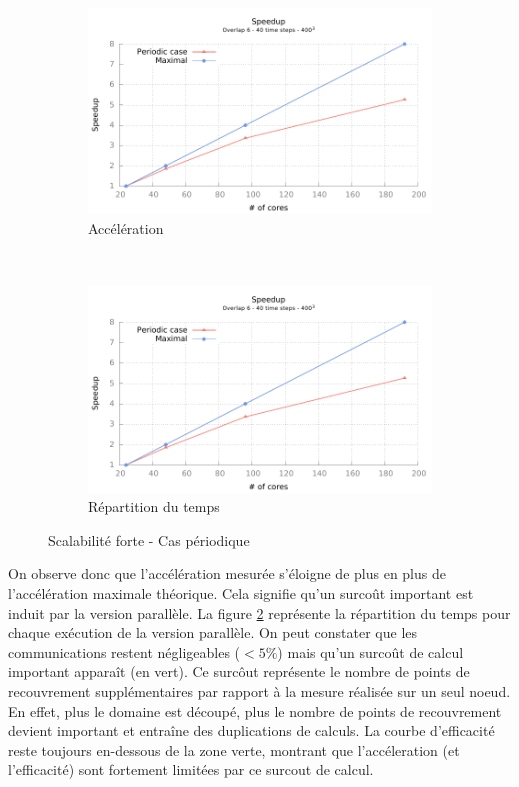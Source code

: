 \begin{figure}[!ht]
  \centering
  \begin{subfigure}[b]{0.5\textwidth}
    \centering
    \includegraphics[scale=0.7]{gnuplot/bench_strong_nemo.pdf}
    \caption{\label{fig:strong_per} Accélération}
  \end{subfigure}%
  ~
  \begin{subfigure}[b]{0.5\textwidth}
    \centering
    \includegraphics[scale=0.7,page=3]{gnuplot/bench_strong_nemo.pdf}
    \caption{\label{fig:strong_per_time} Répartition du temps}
  \end{subfigure}
  \caption{\label{fig:bench_strong_per}Scalabilité forte - Cas périodique}
\end{figure}


On observe donc que l'accélération mesurée s'éloigne de plus en plus de l'accélération maximale théorique. Cela signifie qu'un surcoût important est induit par la version parallèle. La figure \ref{fig:strong_per_time} représente la répartition du temps pour chaque exécution de la version parallèle. On peut constater que les communications restent négligeables ($< 5\%$) mais qu'un surcoût de calcul important apparaît (en vert). Ce surcôut représente le nombre de points de recouvrement supplémentaires par rapport à la mesure réalisée sur un seul noeud. En effet, plus le domaine est découpé, plus le nombre de points de recouvrement devient important et entraîne des duplications de calculs. La courbe d'efficacité reste toujours en-dessous de la zone verte, montrant que l'accéleration (et l'efficacité) sont fortement limitées par ce surcout de calcul.




